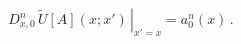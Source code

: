 \begin{equation}
  \label{eq:timeder}
\left. D_{x,0}^n \, \tilde U[A](x;x') \, \right\vert_{x' = x} = a_0^n(x)   \,.
\end{equation}

